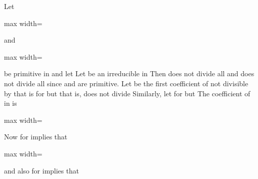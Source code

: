 \documentclass[11pt,oneside]{article}
\begin{document}
\begin{BookBody}
 Let

\begin{center}\begin{adjustbox}{max width=\linewidth}\end{adjustbox}\end{center}

\noindent and

\begin{center}\begin{adjustbox}{max width=\linewidth}\end{adjustbox}\end{center}

\noindent be primitive in  and let  Let  be an irreducible in  Then  does not divide all  and  does not divide all  since  and  are primitive. Let  be the first coefficient of  not divisible by  that is for  but that is,  does not divide  Similarly, let  for  but  The coefficient of  in  is

\begin{center}\begin{adjustbox}{max width=\linewidth}\end{adjustbox}\end{center}

\noindent Now  for  implies that

\begin{center}\begin{adjustbox}{max width=\linewidth}\end{adjustbox}\end{center}

\noindent and also  for  implies that


\end{BookBody}
\end{document}
